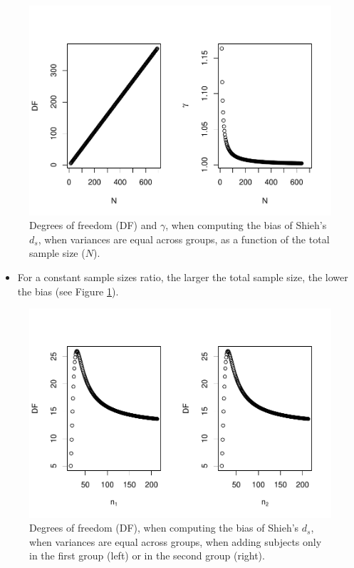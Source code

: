 \documentclass[
  english,
  man]{apa6}
\providecommand{\tightlist}{%
  \setlength{\itemsep}{0pt}\setlength{\parskip}{0pt}}
\begin{document}
\begin{figure}
\centering
\includegraphics{Theoretical-Bias-of-all-estimators-as-a-function-of-population-parameters_files/figure-latex/biasshiehhomNsize2-1.pdf}
\caption{\label{fig:biasshiehhomNsize2}Degrees of freedom (DF) and \(\gamma\), when computing the bias of Shieh's \(d_s\), when variances are equal across groups, as a function of the total sample size (\(N\)).}
\end{figure}

\begin{itemize}
\tightlist
\item
  For a constant sample sizes ratio, the larger the total sample size, the lower the bias (see Figure \ref{fig:biasshiehhomNsize2}).
\end{itemize}

\begin{figure}
\centering
\includegraphics{Theoretical-Bias-of-all-estimators-as-a-function-of-population-parameters_files/figure-latex/biasshiehhomuneqNsize2-1.pdf}
\caption{\label{fig:biasshiehhomuneqNsize2}Degrees of freedom (DF), when computing the bias of Shieh's \(d_s\), when variances are equal across groups, when adding subjects only in the first group (left) or in the second group (right).}
\end{figure}
\end{document}
